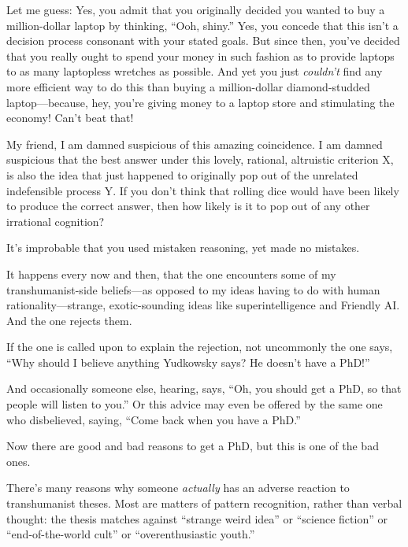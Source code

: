 {
 Let me guess: Yes, you admit that you originally decided you
wanted to buy a million-dollar laptop by thinking,
``Ooh, shiny.'' Yes, you concede
that this isn't a decision process consonant with your
stated goals. But since then, you've decided that you
really ought to spend your money in such fashion as to provide laptops
to as many laptopless wretches as possible. And yet you just
\textit{couldn't} find any more efficient way to do
this than buying a million-dollar diamond-studded laptop---because,
hey, you're giving money to a laptop store and
stimulating the economy! Can't beat that!}

{
 My friend, I am damned suspicious of this amazing coincidence. I
am damned suspicious that the best answer under this lovely, rational,
altruistic criterion X, is also the idea that just happened to
originally pop out of the unrelated indefensible process Y. If you
don't think that rolling dice would have been likely to
produce the correct answer, then how likely is it to pop out of any
other irrational cognition?}

{
 It's improbable that you used mistaken reasoning,
yet made no mistakes.}

\myendsectiontext


{
 It happens every now and then, that the one encounters some of my
transhumanist-side beliefs---as opposed to my ideas having to do with
human rationality---strange, exotic-sounding ideas like
superintelligence and Friendly AI. And the one rejects them. }

{
 If the one is called upon to explain the rejection, not uncommonly
the one says, ``Why should I believe anything
Yudkowsky says? He doesn't have a
PhD!''}

{
 And occasionally someone else, hearing, says,
``Oh, you should get a PhD, so that people will listen
to you.'' Or this advice may even be offered by the
same one who disbelieved, saying, ``Come back when you
have a PhD.''}

{
 Now there are good and bad reasons to get a PhD, but this is one
of the bad ones.}

{
 There's many reasons why someone \textit{actually}
has an adverse reaction to transhumanist theses. Most are matters of
pattern recognition, rather than verbal thought: the thesis matches
against ``strange weird idea'' or
``science fiction'' or
``end-of-the-world cult'' or
``overenthusiastic youth.''}

